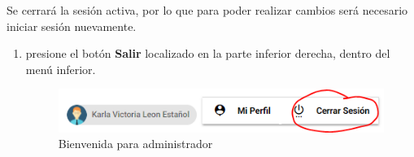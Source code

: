 Se cerrará la sesión activa, por lo que para poder realizar
cambios será necesario iniciar sesión nuevamente.
\begin{enumerate}
	\item presione el botón \textbf{Salir} localizado
		en la parte inferior derecha, dentro del menú inferior.

	\begin{figure}[hbtp]
		
		\includegraphics[scale=0.7]{images/Interfaz/IUGS10_logout.png}
		\caption{Bienvenida para administrador}
	\end{figure}
		
		
\end{enumerate}
